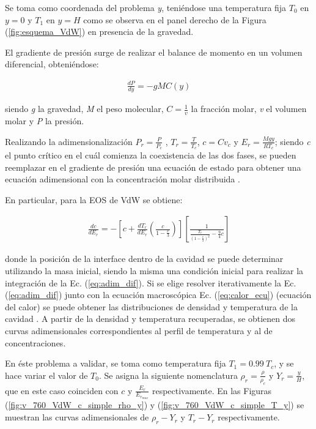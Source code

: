 Se toma como coordenada del problema \textit{y}, teniéndose una temperatura fija $T_{0}$ en $y = 0$ y $T_{1}$ en $y = H$ como se observa en el panel derecho de la Figura (\ref{fig:esquema_VdW}) en presencia de la gravedad.

El gradiente de presión surge de realizar el balance de momento en un volumen diferencial, obteniéndose:

\begin{align}
	\frac{d P}{d y} = - g M C(y)
\end{align}

siendo \textit{g} la gravedad, \textit{M} el peso molecular, $C = \frac{1}{v}$ la fracción molar, \textit{v} el volumen molar y \textit{P} la presión.

Realizando la adimensionalización $ P_r = \frac{P}{P_c}$ , $ T_r = \frac{T}{T_c}$, $c = C v_c$ y $E_r = \frac{M g y}{R T_c}$; siendo \textit{c} el punto crítico en el cuál comienza la coexistencia de las dos fases, se pueden reemplazar en el gradiente de presión una ecuación de estado para obtener una ecuación adimensional con la concentración molar distribuida \cite{fogliatto2019simulation}.



En particular, para la EOS de VdW se obtiene:

\begin{align}
	\frac{d c}{d E_r} = - \left[ c + \frac{d T_r}{d E_r} \left( \frac{c}{1 - \frac{c}{3}}\right) \right] \left[	\frac{1}{\frac{T_r}{{\left(1- \frac{c}{3}\right)}^2} - \frac{9}{4} c}  \right] 
	\label{eq:adim_dif}
\end{align} 

donde la posición de la interface dentro de la cavidad se puede determinar utilizando la masa inicial, siendo la misma una condición inicial para realizar la integración de la Ec. (\ref{eq:adim_dif}). Si se elige  resolver iterativamente la Ec. (\ref{eq:adim_dif}) junto con la ecuación macroscópica Ec. (\ref{eq:calor_ecu}) (ecuación del calor) se puede obtener las distribuciones de densidad y temperatura de la cavidad \cite{fogliatto2019simulation}. A partir de la densidad y temperatura recuperadas, se obtienen dos curvas adimensionales correspondientes al perfil de temperatura y al de concentraciones. 

En éste problema a validar, se toma como temperatura fija $T_1 = 0.99 \> T_c$, y se hace variar el valor de  $T_0$. Se asigna la siguiente nomenclatura $\rho_r = \frac{\rho}{\rho_c}$ y  $Y_r = \frac{y}{H}$, que en este caso coinciden con $c$ y $\frac{E_r}{E_{r_{max}}}$ respectivamente. En las Figuras (\ref{fig:v_760_VdW_c_simple_rho_y}) y (\ref{fig:v_760_VdW_c_simple_T_y}) se muestran las curvas adimensionales de $ \rho_r - Y_r $ y $ T_r - Y_r $ respectivamente.
\newline
